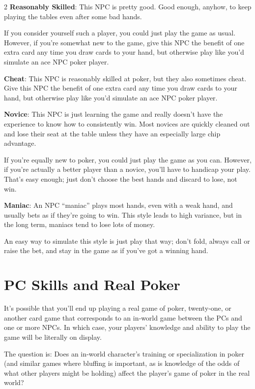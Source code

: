 \begin{multicols}{2}
\textbf{Reasonably Skilled}: This NPC is pretty good. Good enough, anyhow, to keep playing the tables even after some bad hands. 

If you consider yourself such a player, you could just play the game as usual. However, if you’re somewhat new to the game, give this NPC the benefit of one extra card any time you draw cards to your hand, but otherwise play like you’d simulate an ace NPC poker player. 

\textbf{Cheat}: This NPC is reasonably skilled at poker, but they also sometimes cheat. Give this NPC the benefit of one extra card any time you draw cards to your hand, but otherwise play like you’d simulate an ace NPC poker player. 

\textbf{Novice}: This NPC is just learning the game and really doesn’t have the experience to know how to consistently win. Most novices are quickly cleaned out and lose their seat at the table unless they have an especially large chip advantage. 

If you’re equally new to poker, you could just play the game as you can. However, if you’re actually a better player than a novice, you’ll have to handicap your play. That’s easy enough; just don’t choose the best hands and discard to lose, not win. 

\textbf{Maniac}: An NPC “maniac” plays most hands, even with a weak hand, and usually bets as if they’re going to win. This style leads to high variance, but in the long term, maniacs tend to lose lots of money. 

An easy way to simulate this style is just play that way; don’t fold, always call or raise the bet, and stay in the game as if you’ve got a winning hand.

\section{PC Skills and Real Poker}
 
It’s possible that you’ll end up playing a real game of poker, twenty‑one, or another card game that corresponds to an in‑world game between the PCs and one or more NPCs. In which case, your players’ knowledge and ability to play the game will be literally on display. 

The question is: Does an in‑world character’s training or specialization in poker (and similar games where bluffing is important, as is knowledge of the odds of what other players might be holding) affect the player’s game of poker in the real world? 


\end{multicols}
